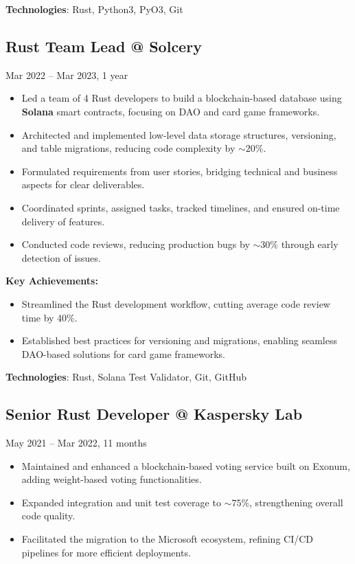 \documentclass[a4paper,12pt]{article}
\begin{document}
\textbf{Technologies}: Rust, Python3, PyO3, Git

\vspace{3mm}

\subsection*{Rust Team Lead @ Solcery}

\quad Mar 2022 – Mar 2023, 1 year

\begin{itemize}[leftmargin=15pt]
    \item Led a team of 4 Rust developers to build a blockchain-based database using \textbf{Solana} smart contracts, focusing on DAO and card game frameworks.
    \item Architected and implemented low-level data storage structures, versioning, and table migrations, reducing code complexity by \(\sim 20\%\).
    \item Formulated requirements from user stories, bridging technical and business aspects for clear deliverables.
    \item Coordinated sprints, assigned tasks, tracked timelines, and ensured on-time delivery of features.
    \item Conducted code reviews, reducing production bugs by \(\sim 30\%\) through early detection of issues.
\end{itemize}

\textbf{Key Achievements:}
\begin{itemize}[leftmargin=15pt]
    \item Streamlined the Rust development workflow, cutting average code review time by 40\%.
    \item Established best practices for versioning and migrations, enabling seamless DAO-based solutions for card game frameworks.
\end{itemize}

\textbf{Technologies}: Rust, Solana Test Validator, Git, GitHub

\vspace{3mm}

\subsection*{Senior Rust Developer @ Kaspersky Lab} 

\quad May 2021 – Mar 2022, 11 months

\begin{itemize}[leftmargin=15pt]
    \item Maintained and enhanced a blockchain-based voting service built on Exonum, adding weight-based voting functionalities.
    \item Expanded integration and unit test coverage to \(\sim 75\%\), strengthening overall code quality.
    \item Facilitated the migration to the Microsoft ecosystem, refining CI/CD pipelines for more efficient deployments.
\end{itemize}
\end{document}
